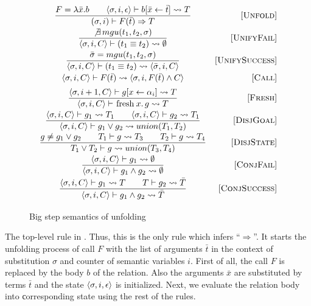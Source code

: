 \begin{figure}[h!]
\[\begin{array}{cr}

\dfrac{ F = \lambda \bar{x}. b \qquad \inbr{\sigma, i, \epsilon} \vdash b[\bar{x} \leftarrow \bar{t}] \leadsto T}
      {(\sigma, i) \vdash F(\bar{t}) \Rightarrow T}
&     \ruleno{Unfold} \\[3mm]
\dfrac{\not\exists \, mgu(t_1, t_2, \sigma)}
      {\inbr{\sigma, i, C} \vdash (t_1 \equiv t_2) \leadsto \emptyset}
&     \ruleno{UnifyFail}  \\[3mm]
\dfrac{\bar\sigma = mgu(t_1, t_2, \sigma)}
      {\inbr{\sigma, i, C} \vdash (t_1 \equiv t_2) \leadsto \inbr{\bar\sigma, i, C}}
&     \ruleno{UnifySuccess}  \\[3mm]
      {\inbr{\sigma, i, C} \vdash F(\bar{t}) \leadsto \inbr{ \sigma, i, F(\bar{t}) \land C}}
&     \ruleno{Call} \\[2mm]
\dfrac{\inbr{\sigma, i+1, C} \vdash g[x \leftarrow \alpha_i] \leadsto T}
      {\inbr{\sigma, i, C} \vdash \mbox{\lstinline|fresh|} \, x. \, g \leadsto T}
&     \ruleno{Fresh}  \\[3mm]
\dfrac{\inbr{\sigma, i, C} \vdash g_1 \leadsto T_1 \qquad \inbr{\sigma, i, C} \vdash g_2 \leadsto T_1}
      {\inbr{\sigma, i, C} \vdash g_1 \lor g_2 \leadsto union(T_1, T_2)}
&     \ruleno{DisjGoal}  \\[3mm]
\dfrac{g \not= g_1 \lor g_2 \qquad T_1 \vdash g \leadsto T_3 \qquad T_2 \vdash g \leadsto T_4}
      {T_1 \lor T_2 \vdash g \leadsto union(T_3, T_4)}
&     \ruleno{DisjState}  \\[3mm]
\dfrac{\inbr{\sigma, i, C} \vdash g_1 \leadsto \emptyset}
      {\inbr{\sigma, i, C} \vdash g_1 \land g_2 \leadsto \emptyset}
&     \ruleno{ConjFail}  \\[3mm]
\dfrac{\inbr{\sigma, i, C} \vdash g_1 \leadsto T \qquad T \vdash g_2 \leadsto \bar{T}}
      {\inbr{\sigma, i, C} \vdash g_1 \land g_2 \leadsto \bar{T}}
&     \ruleno{ConjSuccess}  \\[3mm]
\end{array}\]

\caption{Big step semantics of unfolding}
\label{fair:unfolding-semantics}
\end{figure}

The top-level rule in . Thus, this is the only rule which infers ``$\Rightarrow$''. It starts the unfolding process of call $F$
with the list of arguments $\bar{t}$ in the context of substitution $\sigma$ and counter of semantic variables $i$.
First of all, the call $F$ is replaced by the body $b$ of the relation. Also the arguments $\bar{x}$ are substituted by terms $\bar{t}$ and
the state $\langle \sigma, i, \epsilon \rangle$ is initialized. Next, we evaluate the relation body into сorresponding state using the rest of the rules.

